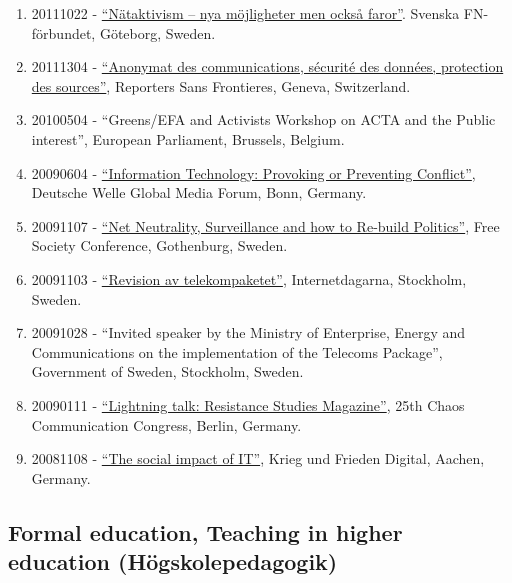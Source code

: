 \documentclass[
]{article}
\begin{document}
\begin{enumerate}
\item
  20111022 -
  \href{http://www.youtube.com/watch?v=6Mi0g93ModU}{``Nätaktivism -- nya
  möjligheter men också faror''}. Svenska FN-förbundet, Göteborg,
  Sweden.
\item
  20111304 -
  \href{http://www.rsf-ch.ch/anonymat-des-communications-s\%C3\%A9curit\%C3\%A9-des-donn\%C3\%A9es-protection-des-sources-0}{``Anonymat
  des communications, sécurité des données, protection des sources''},
  Reporters Sans Frontieres, Geneva, Switzerland.
\item
  20100504 - ``Greens/EFA and Activists Workshop on ACTA and the Public
  interest'', European Parliament, Brussels, Belgium.
\item
  20090604 -
  \href{https://issuu.com/deutsche-welle/docs/program-deutsche-welle-global-media-forum-2009}{``Information
  Technology: Provoking or Preventing Conflict''}, Deutsche Welle Global
  Media Forum, Bonn, Germany.
\item
  20091107 - \href{https://vimeo.com/10286077}{``Net Neutrality,
  Surveillance and how to Re-build Politics''}, Free Society Conference,
  Gothenburg, Sweden.
\item
  20091103 -
  \href{https://internetdagarna.se/arkiv/2009/program-2009/3-november.html}{``Revision
  av telekompaketet''}, Internetdagarna, Stockholm, Sweden.
\item
  20091028 - ``Invited speaker by the Ministry of Enterprise, Energy and
  Communications on the implementation of the Telecoms Package'',
  Government of Sweden, Stockholm, Sweden.
\item
  20090111 -
  \href{https://www.youtube.com/watch?v=G9cXIKvywvs}{``Lightning talk:
  Resistance Studies Magazine''}, 25th Chaos Communication Congress,
  Berlin, Germany.
\item
  20081108 -
  \href{http://www.fiff.de/veranstaltungen/fiff-jahrestagungen/fiff-jahrestagung-2008-krieg-und-frieden-digital/Programmheft.pdf/at_download/file}{``The
  social impact of IT''}, Krieg und Frieden Digital, Aachen, Germany.
\end{enumerate}

\hypertarget{formal-education-teaching-in-higher-education-huxf6gskolepedagogik}{%
\subsection{Formal education, Teaching in higher education
(Högskolepedagogik)}\label{formal-education-teaching-in-higher-education-huxf6gskolepedagogik}}
\end{document}
